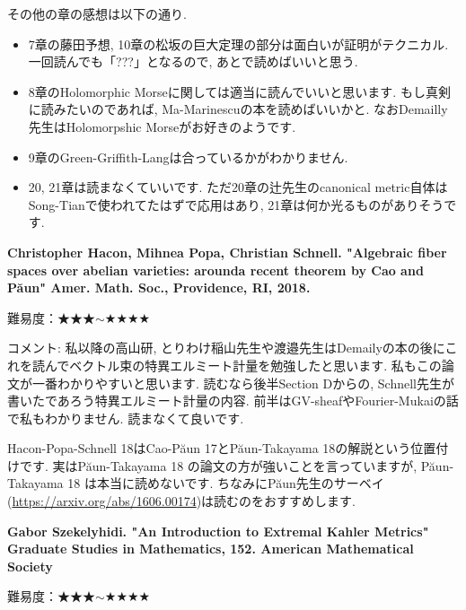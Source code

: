 その他の章の感想は以下の通り.
\vspace{-8pt}
\begin{itemize}[left=0pt]
  \setlength{\parskip}{0cm} %
  \setlength{\itemsep}{0cm} %
\item 7章の藤田予想, 10章の松坂の巨大定理の部分は面白いが証明がテクニカル. 一回読んでも「???」となるので, あとで読めばいいと思う. 
\item 8章のHolomorphic Morseに関しては適当に読んでいいと思います. 
もし真剣に読みたいのであれば, Ma-Marinescuの本を読めばいいかと. なおDemailly先生はHolomorpshic Morseがお好きのようです. 
\item 9章のGreen-Griffith-Langは合っているかがわかりません. 
\item 20, 21章は読まなくていいです. ただ20章の辻先生のcanonical metric自体はSong-Tianで使われてたはずで応用はあり, 21章は何か光るものがありそうです. 
\end{itemize}
\vspace{8pt}

\textbf{Christopher Hacon, Mihnea Popa, Christian Schnell. "Algebraic fiber spaces over abelian varieties: arounda recent theorem by Cao and P\u{a}un"  Amer. Math. Soc., Providence, RI, 2018.}  \vspace{-6pt} 

難易度：★★★$\sim$★★★★ \vspace{-6pt} 

コメント: 私以降の高山研, とりわけ稲山先生や渡邉先生はDemailyの本の後にこれを読んでベクトル束の特異エルミート計量を勉強したと思います. 私もこの論文が一番わかりやすいと思います. 
読むなら後半Section Dからの, Schnell先生が書いたであろう特異エルミート計量の内容. 
前半はGV-sheafやFourier-Mukaiの話で私もわかりません. 読まなくて良いです.

Hacon-Popa-Schnell 18はCao-P\u{a}un 17とP\u{a}un-Takayama 18の解説という位置付けです. 
実はP\u{a}un-Takayama 18 の論文の方が強いことを言っていますが, P\u{a}un-Takayama 18 は本当に読めないです.
ちなみにP\u{a}un先生のサーベイ(\url{https://arxiv.org/abs/1606.00174})は読むのをおすすめします. 
\vspace{8pt}

\textbf{Gabor Szekelyhidi. "An Introduction to Extremal Kahler Metrics" Graduate Studies in Mathematics, 152. American Mathematical Society}  \vspace{-6pt} 

難易度：★★★$\sim$★★★★ \vspace{-6pt} 

